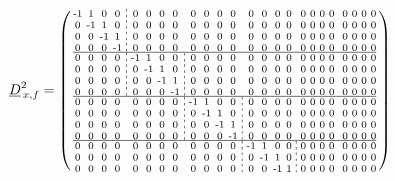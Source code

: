 \documentclass[pdftex,a4paper,parskip,listof=totoc,bibliography=totoc,onehalfspacing,12pt]{scrreprt}
\newcommand*\dashline{\hspace{-0.3em}\rotatebox[origin=c]{90}{\scalebox{-0.3}[1]{$-~~-$}}\hspace{-0.3em}}
\begin{document}
\begin{align*}
	\underline{D}_{\,x,f}^2 &= \begin{psmallmatrix}
\text{-}1 & 1 & 0 & 0 &\dashline& 0 & 0 & 0 & 0 && 0 & 0 & 0 & 0 && 0 & 0 & 0 & 0 && 0 & 0 & 0 & 0 && 0 & 0 & 0 & 0 \\
0 & \text{-}1 & 1 & 0 &\dashline& 0 & 0 & 0 & 0 && 0 & 0 & 0 & 0 && 0 & 0 & 0 & 0 && 0 & 0 & 0 & 0 && 0 & 0 & 0 & 0 \\
0 & 0 & \text{-}1 & 1 &\dashline& 0 & 0 & 0 & 0 && 0 & 0 & 0 & 0 && 0 & 0 & 0 & 0 && 0 & 0 & 0 & 0 && 0 & 0 & 0 & 0 \\
0 & 0 & 0 & \text{-}1 &\dashline& 0 & 0 & 0 & 0 && 0 & 0 & 0 & 0 && 0 & 0 & 0 & 0 && 0 & 0 & 0 & 0 && 0 & 0 & 0 & 0 \\\hline
0 & 0 & 0 & 0 &\dashline& \text{-}1 & 1 & 0 & 0 &\dashline& 0 & 0 & 0 & 0 && 0 & 0 & 0 & 0 && 0 & 0 & 0 & 0 && 0 & 0 & 0 & 0 \\
0 & 0 & 0 & 0 &\dashline& 0 & \text{-}1 & 1 & 0 &\dashline& 0 & 0 & 0 & 0 && 0 & 0 & 0 & 0 && 0 & 0 & 0 & 0 && 0 & 0 & 0 & 0 \\
0 & 0 & 0 & 0 &\dashline& 0 & 0 & \text{-}1 & 1 &\dashline& 0 & 0 & 0 & 0 && 0 & 0 & 0 & 0 && 0 & 0 & 0 & 0 && 0 & 0 & 0 & 0 \\
0 & 0 & 0 & 0 &\dashline& 0 & 0 & 0 & \text{-}1 &\dashline& 0 & 0 & 0 & 0 && 0 & 0 & 0 & 0 && 0 & 0 & 0 & 0 && 0 & 0 & 0 & 0 \\\hline
0 & 0 & 0 & 0 && 0 & 0 & 0 & 0 &\dashline& \text{-}1 & 1 & 0 & 0 &\dashline& 0 & 0 & 0 & 0 && 0 & 0 & 0 & 0 && 0 & 0 & 0 & 0 \\
0 & 0 & 0 & 0 && 0 & 0 & 0 & 0 &\dashline& 0 & \text{-}1 & 1 & 0 &\dashline& 0 & 0 & 0 & 0 && 0 & 0 & 0 & 0 && 0 & 0 & 0 & 0 \\
0 & 0 & 0 & 0 && 0 & 0 & 0 & 0 &\dashline& 0 & 0 & \text{-}1 & 1 &\dashline& 0 & 0 & 0 & 0 && 0 & 0 & 0 & 0 && 0 & 0 & 0 & 0 \\
0 & 0 & 0 & 0 && 0 & 0 & 0 & 0 &\dashline& 0 & 0 & 0 & \text{-}1 &\dashline& 0 & 0 & 0 & 0 && 0 & 0 & 0 & 0 && 0 & 0 & 0 & 0 \\\hline
0 & 0 & 0 & 0 && 0 & 0 & 0 & 0 && 0 & 0 & 0 & 0 &\dashline& \text{-}1 & 1 & 0 & 0 &\dashline& 0 & 0 & 0 & 0 && 0 & 0 & 0 & 0 \\
0 & 0 & 0 & 0 && 0 & 0 & 0 & 0 && 0 & 0 & 0 & 0 &\dashline& 0 & \text{-}1 & 1 & 0 &\dashline& 0 & 0 & 0 & 0 && 0 & 0 & 0 & 0 \\
0 & 0 & 0 & 0 && 0 & 0 & 0 & 0 && 0 & 0 & 0 & 0 &\dashline& 0 & 0 & \text{-}1 & 1 &\dashline& 0 & 0 & 0 & 0 && 0 & 0 & 0 & 0 \\

\end{psmallmatrix}
\end{align*}
\end{document}
